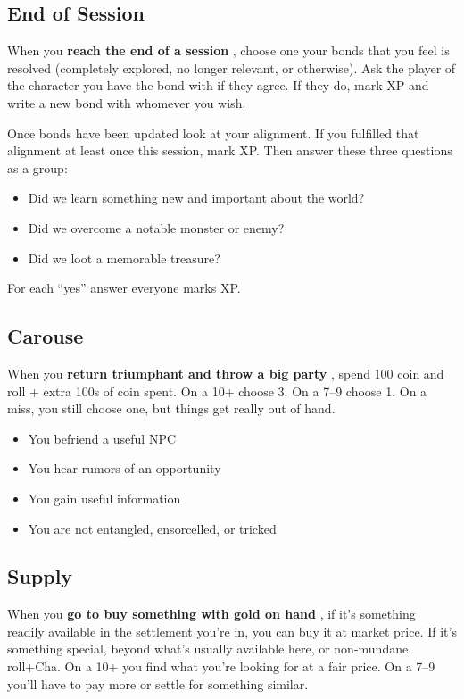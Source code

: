\subsection{End of Session}


 When you \textbf{reach the end of a session}
, choose one your bonds that you feel is resolved (completely explored, no longer relevant, or otherwise). Ask the player of the character you have the bond with if they agree. If they do, mark XP and write a new bond with whomever you wish.


 Once bonds have been updated look at your alignment. If you fulfilled that alignment at least once this session, mark XP. Then answer these three questions as a group:
\begin{itemize}
\item Did we learn something new and important about the world?
\item Did we overcome a notable monster or enemy?
\item Did we loot a memorable treasure?

\end{itemize}


 For each ``yes'' answer everyone marks XP.
\subsection{Carouse}


 When you \textbf{return triumphant and throw a big party}
, spend 100 coin and roll + extra 100s of coin spent. On a 10+ choose 3. On a 7--9 choose 1. On a miss, you still choose one, but things get really out of hand.
\begin{itemize}
\item You befriend a useful NPC
\item You hear rumors of an opportunity
\item You gain useful information
\item You are not entangled, ensorcelled, or tricked

\end{itemize}
\subsection{Supply}


 When you \textbf{go to buy something with gold on hand}
, if it's something readily available in the settlement you're in, you can buy it at market price. If it's something special, beyond what's usually available here, or non-mundane, roll+Cha. On a 10+ you find what you're looking for at a fair price. On a 7--9 you'll have to pay more or settle for something similar.
